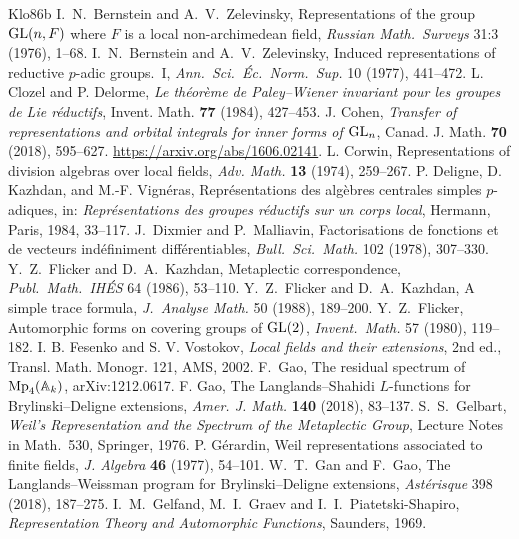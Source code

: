 \begin{thebibliography}{Klo86b}
 I.~N.~Bernstein and A.~V.~Zelevinsky, Representations of the group $\mathrm{GL}(n,F)$ where $F$ is a local non-archimedean field, \emph{Russian Math.\ Surveys} 31:3 (1976), 1--68.
 I.~N.~Bernstein and A.~V.~Zelevinsky, Induced representations of reductive $p$-adic groups.\ I, \emph{Ann.\ Sci.\ \'Ec.\ Norm.\ Sup.} 10 (1977), 441--472.
 L. Clozel and P. Delorme, \emph{Le th\'eor\`eme de Paley--Wiener invariant pour les groupes de Lie r\'eductifs}, Invent. Math. \textbf{77} (1984), 427--453.
 J. Cohen, \emph{Transfer of representations and orbital integrals for inner forms of $\mathrm{GL}_n$}, Canad. J. Math. \textbf{70} (2018), 595--627. \url{https://arxiv.org/abs/1606.02141}.
 L. Corwin, Representations of division algebras over local fields, \emph{Adv. Math.} \textbf{13} (1974), 259--267.
 P. Deligne, D. Kazhdan, and M.-F. Vign\'eras, Repr\'esentations des alg\`ebres centrales simples $p$-adiques, in: \emph{Repr\'esentations des groupes r\'eductifs sur un corps local}, Hermann, Paris, 1984, 33--117.
 J.~Dixmier and P.~Malliavin, Factorisations de fonctions et de vecteurs ind\'efiniment diff\'erentiables, \emph{Bull.\ Sci.\ Math.} 102 (1978), 307--330.
 Y.~Z.~Flicker and D.~A.~Kazhdan, Metaplectic correspondence, \emph{Publ.\ Math.\ IH\'ES} 64 (1986), 53--110.
 Y.~Z.~Flicker and D.~A.~Kazhdan, A simple trace formula, \emph{J.\ Analyse Math.} 50 (1988), 189--200.
 Y.~Z.~Flicker, Automorphic forms on covering groups of $\mathrm{GL}(2)$, \emph{Invent.\ Math.} 57 (1980), 119--182.
 I. B. Fesenko and S. V. Vostokov, \emph{Local fields and their extensions}, 2nd ed., Transl. Math. Monogr. 121, AMS, 2002.
 F.~Gao, The residual spectrum of $\mathrm{Mp}_4(\mathbb{A}_k)$, arXiv:1212.0617.
 F. Gao, The Langlands--Shahidi $L$-functions for Brylinski--Deligne extensions, \emph{Amer. J. Math.} \textbf{140} (2018), 83--137.
 S.~S.~Gelbart, \emph{Weil's Representation and the Spectrum of the Metaplectic Group}, Lecture Notes in Math.\ 530, Springer, 1976.
 P. G\'erardin, Weil representations associated to finite fields, \emph{J. Algebra} \textbf{46} (1977), 54--101.
 W.~T.~Gan and F.~Gao, The Langlands--Weissman program for Brylinski--Deligne extensions, \emph{Ast\'erisque} 398 (2018), 187--275.
 I.~M.~Gelfand, M.~I.~Graev and I.~I.~Piatetski-Shapiro, \emph{Representation Theory and Automorphic Functions}, Saunders, 1969.

\end{thebibliography}
